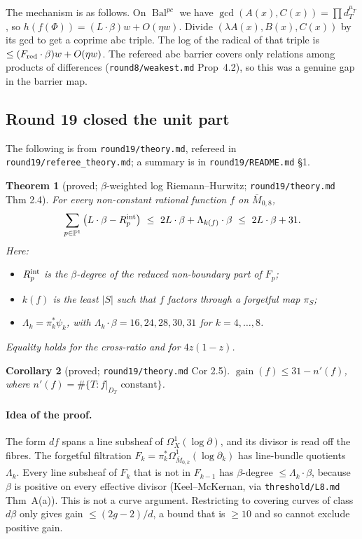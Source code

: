\documentclass[11pt]{article}
\newtheorem{theorem}{Theorem}[section]
\newtheorem{corollary}[theorem]{Corollary}
\newcommand{\PP}{\mathbb P}
\newcommand{\Mbar}{\overline M_{0,8}}
\newcommand{\Bal}{\operatorname{Bal}}
\newcommand{\gain}{\operatorname{gain}}
\newcommand{\rec}[1]{\texttt{#1}}
\begin{document}
The mechanism is as follows.  On \(\Bal^{pc}\) we have
\(\gcd(A(x),C(x))=\prod d_T^{\mu_T}\), so
\(h(f(\Phi))=(L\cdot\beta)w+O(\eta w)\).  Divide \((\lambda A(x),B(x),C(x))\) by
its gcd to get a coprime abc triple.  The log of the radical of that triple is
\(\le(F_{\rm red}\cdot\beta)w+O(\eta w)\).  The refereed abc barrier covers
only relations among products of differences (\rec{round8/weakest.md}
Prop~4.2), so this was a genuine gap in the barrier map.

\subsection{Round 19 closed the unit part}

The following is from \rec{round19/theory.md}, refereed in
\rec{round19/referee\_theory.md}; a summary is in \rec{round19/README.md}
\S1.

\begin{theorem}[proved; \(\beta\)-weighted log Riemann--Hurwitz; \rec{round19/theory.md} Thm 2.4]\label{thm:RH}
For every non-constant rational function \(f\) on \(\Mbar\),
\[
  \sum_{p\in\PP^1}\big(L\cdot\beta-R_p^{\rm int}\big)
  \ \le\ 2L\cdot\beta+\Lambda_{k(f)}\cdot\beta
  \ \le\ 2L\cdot\beta+31 .
\]
Here:
\begin{itemize}
  \item \(R_p^{\rm int}\) is the \(\beta\)-degree of the reduced non-boundary
    part of \(F_p\);
  \item \(k(f)\) is the least \(|S|\) such that \(f\) factors through a
    forgetful map \(\pi_S\);
  \item \(\Lambda_k=\pi_k^*\psi_k\), with \(\Lambda_k\cdot\beta=16,24,28,30,31\)
    for \(k=4,\dots,8\).
\end{itemize}
Equality holds for the cross-ratio and for \(4z(1-z)\).
\end{theorem}

\begin{corollary}[proved; \rec{round19/theory.md} Cor 2.5]\label{cor:gain31}
\(\gain(f)\le31-n'(f)\), where \(n'(f)=\#\{T: f|_{D_T}\text{ constant}\}\).
\end{corollary}

\paragraph{Idea of the proof.}
The form \(df\) spans a line subsheaf of \(\Omega^1_X(\log\partial)\), and its
divisor is read off the fibres.  The forgetful filtration
\(F_k=\pi_k^*\Omega^1_{\overline M_{0,k}}(\log\partial_k)\) has line-bundle
quotients \(\Lambda_k\).  Every line subsheaf of \(F_k\) that is not in
\(F_{k-1}\) has \(\beta\)-degree \(\le\Lambda_k\cdot\beta\), because \(\beta\) is
positive on every effective divisor (Keel--McKernan, via
\rec{threshold/L8.md} Thm~A(a)).  This is not a curve argument.  Restricting to
covering curves of class \(d\beta\) only gives gain \(\le(2g-2)/d\), a bound
that is \(\ge10\) and so cannot exclude positive gain.
\end{document}
